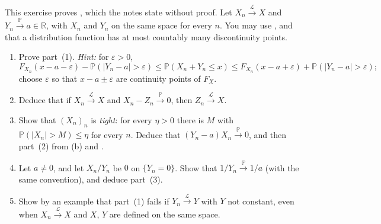 \begin{exercise}\label{ex:cl-slutsky}
\hard This exercise proves , which the notes state without
proof. Let $X_n\xrightarrow{\mathcal L}X$ and $Y_n\xrightarrow{\mathbb P}a\in\mathbb R$, with $X_n$
and $Y_n$ on the same space for every $n$. You may use , and that a
distribution function has at most countably many discontinuity points.
\begin{enumerate}[label=(\alph*)]
  \item Prove part~(1). \emph{Hint:} for $\varepsilon>0$,
    \[
      F_{X_n}(x-a-\varepsilon)-\mathbb P(|Y_n-a|>\varepsilon)\le\mathbb P(X_n+Y_n\le x)
      \le F_{X_n}(x-a+\varepsilon)+\mathbb P(|Y_n-a|>\varepsilon);
    \]
    choose $\varepsilon$ so that $x-a\pm\varepsilon$ are continuity points of $F_X$.
  \item Deduce that if $X_n\xrightarrow{\mathcal L}X$ and $X_n-Z_n\xrightarrow{\mathbb P}0$, then
    $Z_n\xrightarrow{\mathcal L}X$.
  \item Show that $(X_n)_n$ is \emph{tight}: for every $\eta>0$ there is $M$ with
    $\mathbb P(|X_n|>M)\le\eta$ for every $n$. Deduce that $(Y_n-a)X_n\xrightarrow{\mathbb P}0$, and
    then part~(2) from (b) and .
  \item Let $a\ne0$, and let $X_n/Y_n$ be $0$ on $\{Y_n=0\}$. Show that $1/Y_n\xrightarrow{\mathbb
    P}1/a$ (with the same convention), and deduce part~(3).
  \item Show by an example that part~(1) fails if $Y_n\xrightarrow{\mathcal L}Y$ with $Y$ not
    constant, even when $X_n\xrightarrow{\mathcal L}X$ and $X$, $Y$ are defined on the same space.
\end{enumerate}
\end{exercise}

